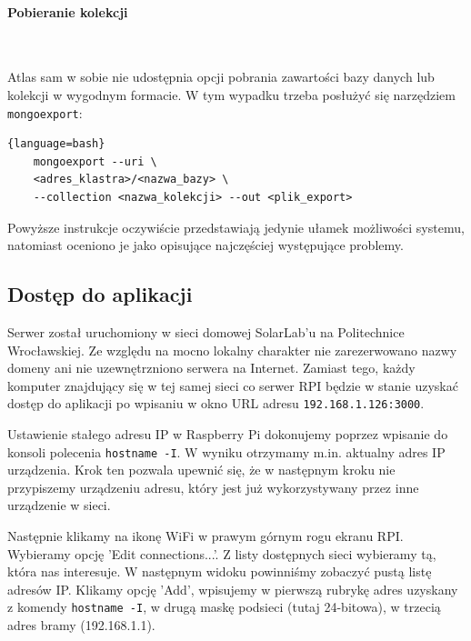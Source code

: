 \paragraph{Pobieranie kolekcji} \

Atlas sam w sobie nie udostępnia opcji pobrania zawartości bazy danych lub kolekcji w wygodnym formacie. W tym wypadku 
trzeba posłużyć się narzędziem \lstinline|mongoexport|:

\begin{lstlisting}{language=bash}
    mongoexport --uri \ 
    <adres_klastra>/<nazwa_bazy> \ 
    --collection <nazwa_kolekcji> --out <plik_export>
\end{lstlisting}

Powyższe instrukcje oczywiście przedstawiają jedynie ułamek możliwości systemu, natomiast oceniono je jako opisujące najczęściej występujące problemy. 

\subsection{Dostęp do aplikacji}

Serwer został uruchomiony w sieci domowej SolarLab'u na Politechnice Wrocławskiej. Ze względu na mocno lokalny charakter
nie zarezerwowano nazwy domeny ani nie uzewnętrzniono serwera na Internet. Zamiast tego, każdy komputer znajdujący się w tej samej sieci co serwer RPI 
będzie w stanie uzyskać dostęp do aplikacji po wpisaniu w okno URL adresu \lstinline|192.168.1.126:3000|.

Ustawienie stałego adresu IP w Raspberry Pi dokonujemy poprzez wpisanie do konsoli polecenia \lstinline|hostname -I|. W wyniku otrzymamy m.in. aktualny adres IP urządzenia.
Krok ten pozwala upewnić się, że w następnym kroku nie przypiszemy urządzeniu adresu, który jest już wykorzystywany przez inne urządzenie w sieci.

Następnie klikamy na ikonę WiFi w prawym górnym rogu ekranu RPI. Wybieramy opcję 'Edit connections...'.
Z listy dostępnych sieci wybieramy tą, która nas interesuje. W następnym widoku powinniśmy zobaczyć pustą listę adresów IP. Klikamy opcję 'Add', wpisujemy 
w pierwszą rubrykę adres uzyskany z komendy \lstinline|hostname -I|, w drugą maskę podsieci (tutaj 24-bitowa), w trzecią adres bramy (192.168.1.1).
